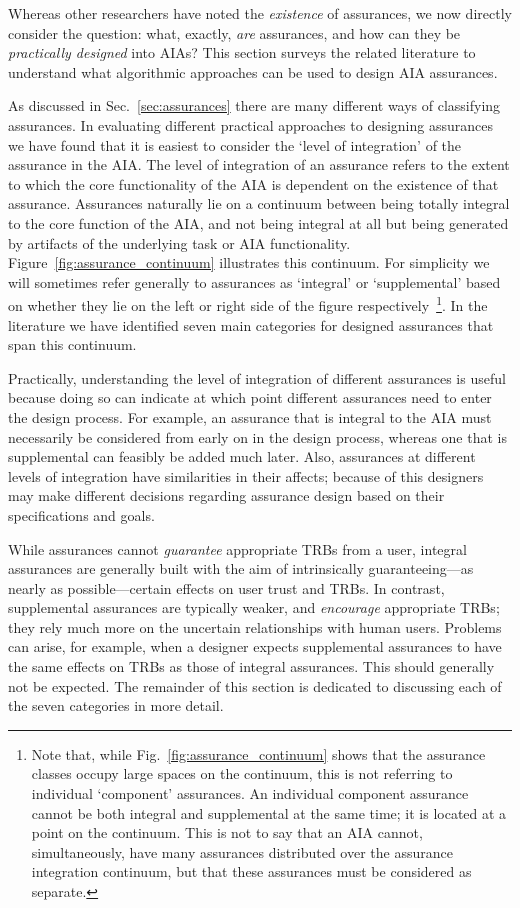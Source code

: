 Whereas other researchers have noted the \textit{existence} of assurances, we now directly consider the question: what, exactly, \textit{are} assurances, and how can they be \textit{practically designed} into AIAs? 
This section surveys the related literature to understand what algorithmic approaches can be used to design AIA assurances. 

As discussed in Sec.~\ref{sec:assurances} there are many different ways of classifying assurances. In evaluating different practical approaches to designing assurances we have found that it is easiest to consider the `level of integration' of the assurance in the AIA. The level of integration of an assurance refers to the extent to which the core functionality of the AIA is dependent on the existence of that assurance. Assurances naturally lie on a continuum between being totally integral to the core function of the AIA, and not being integral at all but being generated by artifacts of the underlying task or AIA functionality.  Figure~\ref{fig:assurance_continuum} illustrates this continuum. For simplicity we will sometimes refer generally to assurances as `integral' or `supplemental' based on whether they lie on the left or right side of the figure respectively~\footnote{Note that, while Fig.~\ref{fig:assurance_continuum} shows that the assurance classes occupy large spaces on the continuum, this is not referring to individual `component' assurances. An individual component assurance cannot be both integral and supplemental at the same time; it is located at a point on the continuum. This is not to say that an AIA cannot, simultaneously, have many assurances distributed over the assurance integration continuum, but that these assurances must be considered as separate.}. In the literature we have identified seven main categories for designed assurances that span this continuum.

Practically, understanding the level of integration of different assurances is useful because doing so can indicate at which point different assurances need to enter the design process. For example, an assurance that is integral to the AIA must necessarily be considered from early on in the design process, whereas one that is supplemental can feasibly be added much later. Also, assurances at different levels of integration have similarities in their affects; because of this designers may make different decisions regarding assurance design based on their specifications and goals.

While assurances cannot \emph{guarantee} appropriate TRBs from a user, integral assurances are generally built with the aim of intrinsically guaranteeing---as nearly as possible---certain effects on user trust and TRBs. In contrast, supplemental assurances are typically weaker, and \emph{encourage} appropriate TRBs; they rely much more on the uncertain relationships with human users. Problems can arise, for example, when a designer expects supplemental assurances to have the same effects on TRBs as those of integral assurances. This should generally not be expected. The remainder of this section is dedicated to discussing each of the seven categories in more detail.

